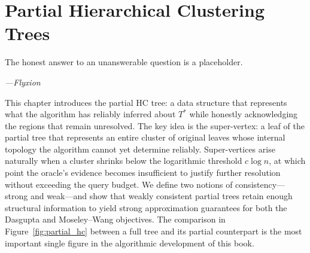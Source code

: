 \chapter{Partial Hierarchical Clustering Trees}
\label{ch:partial_hc}

\epigraph{%
  The honest answer to an unanswerable question is a placeholder.%
}{\textit{---Flyxion}}

This chapter introduces the partial HC tree: a data structure that represents what the algorithm has reliably inferred about $T^*$ while honestly acknowledging the regions that remain unresolved. The key idea is the super-vertex: a leaf of the partial tree that represents an entire cluster of original leaves whose internal topology the algorithm cannot yet determine reliably. Super-vertices arise naturally when a cluster shrinks below the logarithmic threshold $c\log n$, at which point the oracle's evidence becomes insufficient to justify further resolution without exceeding the query budget. We define two notions of consistency---strong and weak---and show that weakly consistent partial trees retain enough structural information to yield strong approximation guarantees for both the Dasgupta and Moseley--Wang objectives. The comparison in Figure~\ref{fig:partial_hc} between a full tree and its partial counterpart is the most important single figure in the algorithmic development of this book.

